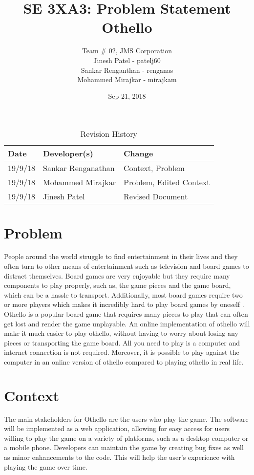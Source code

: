 \documentclass{article}
\title{SE 3XA3: Problem Statement\\Othello}
\author{Team \# 02, JMS Corporation
		\\ Jinesh Patel - patelj60
		\\ Sankar Renganthan - renganas
		\\ Mohammed Mirajkar - mirajkam
}
\date{Sep 21, 2018}
\begin{document}
\begin{table}[hp]
	\caption{Revision History} \label{TblRevisionHistory}
	\begin{tabularx}{\textwidth}{llX}
		\toprule
		\textbf{Date} & \textbf{Developer(s)} & \textbf{Change}         \\
		\midrule
		19/9/18       & Sankar Renganathan    & Context, Problem        \\
		19/9/18       & Mohammed Mirajkar     & Problem, Edited Context \\
		19/9/18       & Jinesh Patel          & Revised Document        \\
		\bottomrule
	\end{tabularx}
\end{table}

\newpage

\maketitle

\section{Problem}
People around the world struggle to find entertainment in their lives and they often turn to other means of entertainment such as television and board games to distract themselves. Board games are very enjoyable but they require many components to play properly, such as, the game pieces and the game board, which can be a hassle to transport. {\color{blue} Additionally, most board games require two or more players which makes it incredibly hard to play board games by oneself . Othello is a popular board game that requires many pieces to play that can often get lost and render the game unplayable. An online implementation of othello will make it much easier to play othello, without having to worry about losing any pieces or transporting the game board. All you need to play is a computer and  internet connection is not required. Moreover, it is possible to play against the computer in an online version of othello compared to playing othello in real life.}


\section{Context}

The main stakeholders for Othello are the users who play the game. The software will be implemented as a web application, allowing for easy access for users willing to play the game on a variety of platforms, such as a desktop computer or a mobile phone. Developers can maintain the game by creating bug fixes as well as minor enhancements to the code. This will help the user's experience with playing the game over time.
\end{document}
